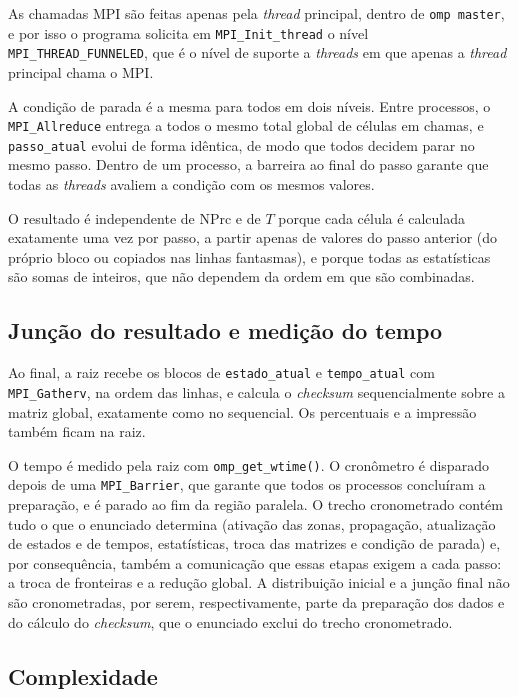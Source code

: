 \documentclass[11pt,a4paper]{article}
\begin{document}
As chamadas MPI são feitas apenas pela \emph{thread} principal, dentro de \texttt{omp master}, e por isso o programa solicita em \texttt{MPI\_Init\_thread} o nível \texttt{MPI\_THREAD\_FUNNELED}, que é o nível de suporte a \emph{threads} em que apenas a \emph{thread} principal chama o MPI.

A condição de parada é a mesma para todos em dois níveis. Entre processos, o \texttt{MPI\_Allreduce} entrega a todos o mesmo total global de células em chamas, e \texttt{passo\_atual} evolui de forma idêntica, de modo que todos decidem parar no mesmo passo. Dentro de um processo, a barreira ao final do passo garante que todas as \emph{threads} avaliem a condição com os mesmos valores.

O resultado é independente de NPrc e de $T$ porque cada célula é calculada exatamente uma vez por passo, a partir apenas de valores do passo anterior (do próprio bloco ou copiados nas linhas fantasmas), e porque todas as estatísticas são somas de inteiros, que não dependem da ordem em que são combinadas.

\subsection{Junção do resultado e medição do tempo}

Ao final, a raiz recebe os blocos de \texttt{estado\_atual} e \texttt{tempo\_atual} com \texttt{MPI\_Gatherv}, na ordem das linhas, e calcula o \emph{checksum} sequencialmente sobre a matriz global, exatamente como no sequencial. Os percentuais e a impressão também ficam na raiz.

O tempo é medido pela raiz com \texttt{omp\_get\_wtime()}. O cronômetro é disparado depois de uma \texttt{MPI\_Barrier}, que garante que todos os processos concluíram a preparação, e é parado ao fim da região paralela. O trecho cronometrado contém tudo o que o enunciado determina (ativação das zonas, propagação, atualização de estados e de tempos, estatísticas, troca das matrizes e condição de parada) e, por consequência, também a comunicação que essas etapas exigem a cada passo: a troca de fronteiras e a redução global. A distribuição inicial e a junção final não são cronometradas, por serem, respectivamente, parte da preparação dos dados e do cálculo do \emph{checksum}, que o enunciado exclui do trecho cronometrado.

\subsection{Complexidade}
\end{document}
